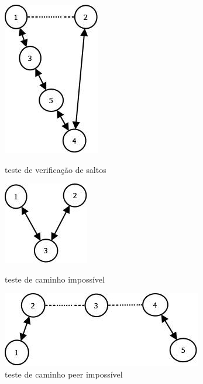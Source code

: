 \documentclass[a4paper]{article}
\begin{document}
\begin{landscape}

\begin{figure}[!htb]
  \includegraphics[scale=0.3]{hops_verify.jpg}
  \caption{teste de verificação de saltos}\label{fig:teste de verificação de saltos}
\endminipage\hfill
{}
  \includegraphics[scale=0.3]{imp_link.jpg}
  \caption{teste de caminho impossível}\label{fig:teste de caminho impossível}
\endminipage\hfill
{}%
  \includegraphics[width=\linewidth]{peer_impossivel_txt.jpg}
  \caption{teste de caminho peer impossível}\label{fig:teste de caminho peer impossível}
\endminipage
\end{figure}




\end{landscape}
\end{document}
